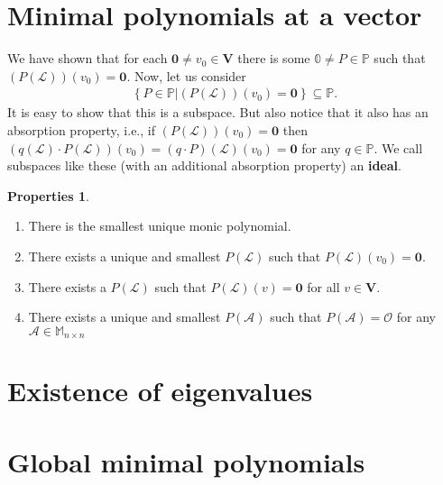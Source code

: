 \documentclass{book}
\theoremstyle{definition}
\newtheorem{prop}{Properties}[section]
\newcommand{\V}{\mathbf{V}}
\newcommand{\lag}{\mathcal{L}}
\begin{document}
\section{Minimal polynomials at a vector}

We have shown that for each $\mathbf{0} \neq v_0 \in \V$ there is some $\mathbb{0} \neq P \in \mathbb{P}$ such that $(P(\lag))(v_0) = \mathbf{0}$. Now, let us consider
\begin{align*}
\left\{ 
P \in \mathbb{P} 
\bigg\vert
(P(\lag))(v_0) = \mathbf{0}  
\right\} 
\subseteq \mathbb{P}.
\end{align*}
It is easy to show that this is a subspace. But also notice that it also has an absorption property, i.e., if $(P(\lag))(v_0) = \mathbf{0} $ then $(q(\lag) \cdot P(\lag))(v_0) = (q\cdot P)(\lag)(v_0) = \mathbf{0}  $ for any $q\in \mathbb{P}$. We call subspaces like these (with an additional absorption property) an \textbf{ideal}. 

\begin{prop}
	$\,$
	\begin{enumerate}
	\item There is the smallest unique monic polynomial.
	\item There exists a unique and smallest $P(\lag)$ such that $P(\lag)(v_0) = \mathbf{0}$. 
	\item There exists a $P(\lag)$ such that $P(\lag)(v) = \mathbf{0}$ for all $v\in \V$.
	\item There exists a unique and smallest $P(\mathcal{A})$ such that $P(\mathcal{A}) = \mathcal{O}$ for any $\mathcal{A} \in \mathbb{M}_{n\times n}$ 
\end{enumerate}
\end{prop}
	
	








\section{Existence of eigenvalues}
\section{Global minimal polynomials}
\end{document}
